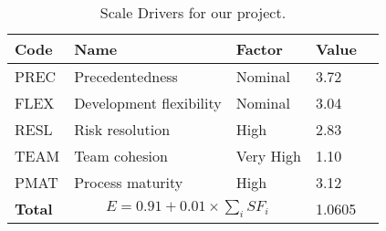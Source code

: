\begin{table}
    \centering
    \begin{tabular}{| l | l | l | l | l |}
        \hline
        \textbf{Code}   & \textbf{Name}             & \textbf{Factor}   & \textbf{Value}    \\
        \hline
        PREC            & Precedentedness           & Nominal               & 3.72                 \\
        \hline
        FLEX            & Development flexibility   & Nominal           & 3.04                 \\
        \hline
        RESL            & Risk resolution           & High              & 2.83                 \\
        \hline
        TEAM            & Team cohesion             & Very High         & 1.10                 \\
        \hline
        PMAT            & Process maturity          & High              & 3.12                 \\
        \hline
        \textbf{Total}  & \multicolumn{2}{|c|}{$E=0.91 + 0.01 \times \sum_{i}SF_i$}    & 1.0605       \\
        \hline
    \end{tabular}
    \caption{Scale Drivers for our project.}
    \label{tab:scale-drivers}
\end{table}



